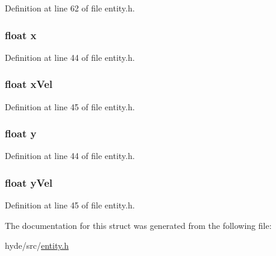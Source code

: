 Definition at line 62 of file entity.\+h.

\hypertarget{structentity__s_ad0da36b2558901e21e7a30f6c227a45e}{}
\subsubsection[{x}]{\setlength{\rightskip}{0pt plus 5cm}float x}\label{structentity__s_ad0da36b2558901e21e7a30f6c227a45e}


Definition at line 44 of file entity.\+h.

\hypertarget{structentity__s_a68ba7133c5359e424ce5d727d9665a25}{}
\subsubsection[{x\+Vel}]{\setlength{\rightskip}{0pt plus 5cm}float x\+Vel}\label{structentity__s_a68ba7133c5359e424ce5d727d9665a25}


Definition at line 45 of file entity.\+h.

\hypertarget{structentity__s_aa4f0d3eebc3c443f9be81bf48561a217}{}
\subsubsection[{y}]{\setlength{\rightskip}{0pt plus 5cm}float y}\label{structentity__s_aa4f0d3eebc3c443f9be81bf48561a217}


Definition at line 44 of file entity.\+h.

\hypertarget{structentity__s_ada909419c1e8025397fcbba8a9e65a26}{}
\subsubsection[{y\+Vel}]{\setlength{\rightskip}{0pt plus 5cm}float y\+Vel}\label{structentity__s_ada909419c1e8025397fcbba8a9e65a26}


Definition at line 45 of file entity.\+h.



The documentation for this struct was generated from the following file\+:\begin{DoxyCompactItemize}
\item 
hyde/src/\hyperlink{entity_8h}{entity.\+h}\end{DoxyCompactItemize}
